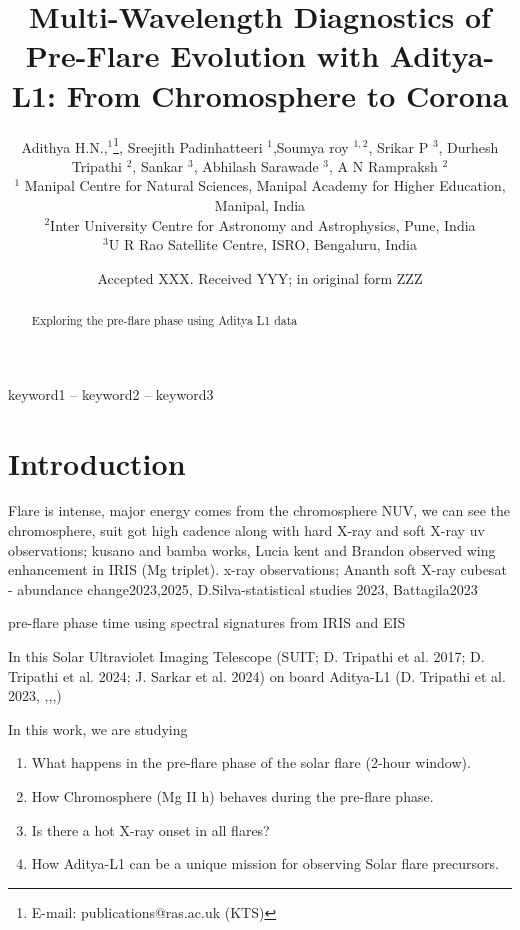 \documentclass[fleqn,usenatbib]{mnras}
\title[Pre-flare study with Aditya-L1]{Multi-Wavelength Diagnostics of Pre-Flare Evolution with Aditya-L1: From Chromosphere to Corona}
\author[Adithya H. N.]{
Adithya H.N.,$^{1}$\thanks{E-mail: publications@ras.ac.uk (KTS)},
Sreejith Padinhatteeri $^{1}$,Soumya roy $^{1,2}$,
 Srikar P $^{3}$,
Durhesh Tripathi $^{2}$,
\newauthor
Sankar $^{3}$, Abhilash Sarawade $^{3}$,  
A N Rampraksh $^{2}$
\\
$^{1}$ Manipal Centre for Natural Sciences, Manipal Academy for Higher Education, Manipal, India\\
$^{2}$Inter University Centre for Astronomy and Astrophysics, Pune, India\\
$^{3}$U R Rao Satellite Centre, ISRO, Bengaluru, India\\
}
\date{Accepted XXX. Received YYY; in original form ZZZ}
\begin{document}
\label{firstpage}
\pagerange{\pageref{firstpage}--\pageref{lastpage}}
\maketitle

\begin{abstract}
Exploring the pre-flare phase using Aditya L1 data
\end{abstract}

\begin{keywords}
keyword1 -- keyword2 -- keyword3
\end{keywords}



\section{Introduction}

   Flare is intense, major energy comes from the chromosphere
   NUV, we can see the chromosphere, suit got high cadence
   along with hard X-ray and soft X-ray
uv observations; kusano and bamba works,
Lucia kent and Brandon observed wing enhancement in IRIS (Mg triplet).
x-ray observations;
Ananth soft X-ray cubesat - abundance change2023,2025, D.Silva-statistical studies 2023, Battagila2023

pre-flare phase time using spectral signatures from IRIS and EIS


In this 
Solar Ultraviolet Imaging Telescope (SUIT; D. Tripathi et al. 2017; D. Tripathi et al. 2024; J. Sarkar et al. 2024) on board Aditya-L1 (D. Tripathi et al. 2023, \cite{sarkar_test_2025},\cite{Tripathi2017},\cite{tripathi_solar_2025},\cite{Tripathi2023})

In this work, we are studying
\begin{enumerate}
    \item What happens in the pre-flare phase of the solar flare (2-hour window).
    \item How Chromosphere (Mg II h) behaves during the pre-flare phase.
    \item Is there a hot X-ray onset in all flares?
    \item How Aditya-L1 can be a unique mission for observing Solar flare precursors.    
\end{enumerate}
\end{document}
